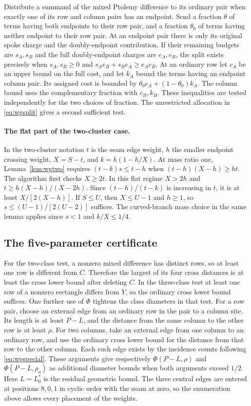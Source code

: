 \documentclass[11pt,a4paper]{article}
\theoremstyle{definition}
\begin{document}
Distribute a summand of the mixed Ptolemy difference to its ordinary pair
when exactly one of its row and column pairs has an endpoint.  Send a
fraction $\theta$ of terms having both endpoints to their row pair,
and a fraction $\theta_0$ of terms having neither endpoint to their row
pair.  At an endpoint pair there is only its original spoke charge and
the doubly-endpoint contribution.  If their remaining budgets are $s_A,s_B$
and the full doubly-endpoint charges are $e_A,e_B$, the split exists
precisely when $s_A,s_B\ge0$ and
$s_A e_B+s_B e_A\ge e_A e_B$.  At an ordinary row let $c_A$ be an
upper bound on the full cost, and let $k_A$ bound the terms having an
endpoint column pair.  Its assigned cost is bounded by
$\theta_0 c_A+(1-\theta_0)k_A$.  The column bound uses the complementary
fraction with $c_B,k_B$.  These inequalities are tested independently for the two choices of
fraction. The unrestricted allocation in \eqref{eq:wgsplit} gives a
second sufficient test.

\paragraph{The flat part of the two-cluster case.}
In the two-cluster notation $t$ is the seam edge weight, $h$ the smaller
endpoint crossing weight, $X=S-t$, and $k=h(1-h/X)$.  At mass ratio one, Lemma~\ref{lem:wgtwo}
requires $(t-k)s\le t-h$ when
$(t-h)(X-h)\ge ht$.  The algorithm first checks $X\ge2t$.  In this
flat regime $X>2h$ and $t\ge h(X-h)/(X-2h)$.  Since
$(t-h)/(t-k)$ is increasing in $t$, it is at least $X/[2(X-h)]$.
If $S\le U$, then $X\le U-1$ and $h\ge1$, so $s\le(U-1)/[2(U-2)]$
suffices.  The curved-branch mass choice in the same lemma
applies since $s<1$ and $k/X\le1/4$.

\subsection{The five-parameter certificate}

For the two-class test, a nonzero mixed difference has distinct rows,
so at least one row is different from $C$. Therefore the largest
of its four cross distances is at least the cross lower bound after
deleting $C$. In the three-class test at least one row of a nonzero
rectangle differs from $Y$, so the ordinary cross lower bound suffices.
One further use of $\Phi$ tightens the class diameters in that test.
For a row pair, choose an external edge from an ordinary row in
the pair to a column site. Its length is at least $P-L$, and the
distance from the same column to the other row is at least $\rho$.
For two columns, take an external edge from one column to an ordinary
row, and use the ordinary cross lower bound for the distance from
that row to the other column. Each such edge exists by the incidence
counts following \eqref{eq:wgspecial}. These arguments give respectively
$\Phi(P-L,\rho)$ and $\Phi(P-L,\rho_o)$ as additional diameter bounds
when both arguments exceed $1/2$. Here $L=L_0^*$ is the residual
geometric bound. The three central edges are entered at positions
$8,0,1$ in cyclic order with the seam at zero, so the enumeration
above allows every placement of the weights.
\end{document}
